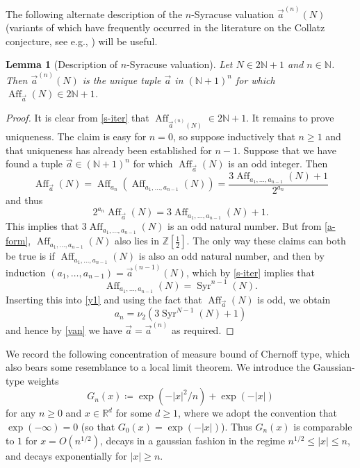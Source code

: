 \documentclass[12pt,a4paper,reqno]{amsart}
\numberwithin{equation}{section}
\theoremstyle{plain}
\newtheorem{lemma}[theorem]{Lemma}
\theoremstyle{definition}
\newcommand\R{\mathbb{R}}
\newcommand\Z{\mathbb{Z}}
\newcommand\N{\mathbb{N}}
\newcommand\Aff{{\operatorname{Aff}}}
\newcommand\Syr{{\operatorname{Syr}}}
\begin{document}
The following alternate description of the $n$-Syracuse valuation $\vec a^{(n)}(N)$ (variants of which have frequently occurred in the literature on the Collatz conjecture, see e.g., \cite{sinai}) will be useful.

\begin{lemma}[Description of $n$-Syracuse valuation]\label{iter-lem}  Let $N \in 2\N+1$ and $n \in \N$.  Then $\vec a^{(n)}(N)$ is the unique tuple $\vec a$ in $(\N+1)^n$ for which $\Aff_{\vec a}(N) \in 2\N+1$.
\end{lemma}

\begin{proof}  It is clear from \eqref{s-iter} that $\Aff_{\vec a^{(n)}(N)} \in 2\N+1$.  It remains to prove uniqueness.  The claim is easy for $n=0$, so suppose inductively that $n \geq 1$ and that uniqueness has already been established for $n-1$.  Suppose that we have found a tuple $\vec a \in (\N+1)^n$ for which $\Aff_{\vec a}(N)$ is an odd integer.  Then
$$ \Aff_{\vec a}(N) = \Aff_{a_n}( \Aff_{a_1,\dots,a_{n-1}}(N) ) = \frac{3\Aff_{a_1,\dots,a_{n-1}}(N)+1}{2^{a_n}}$$
and thus
\begin{equation}\label{y1}
 2^{a_n} \Aff_{\vec a}(N) =3\Aff_{a_1,\dots,a_{n-1}}(N)+1.
\end{equation}
This implies that $3\Aff_{a_1,\dots,a_{n-1}}(N)$ is an odd natural number.  But from \eqref{a-form}, $\Aff_{a_1,\dots,a_{n-1}}(N)$ also lies in $\Z[\frac{1}{2}]$.  The only way these claims can both be true is if $\Aff_{a_1,\dots,a_{n-1}}(N)$ is also an odd natural number, and then by induction $(a_1,\dots,a_{n-1}) = \vec a^{(n-1)}(N)$, which by \eqref{s-iter} implies that
$$ \Aff_{a_1,\dots,a_{n-1}}(N) = \Syr^{n-1}(N).$$
Inserting this into \eqref{y1} and using the fact that $\Aff_{\vec a}(N)$ is odd, we obtain
$$ a_n = \nu_2( 3\Syr^{N-1}(N) + 1 )$$
and hence by \eqref{van} we have $\vec a = \vec a^{(n)}$ as required.
\end{proof}

We record the following concentration of measure bound of Chernoff type, which also bears some resemblance to a local limit theorem.  We introduce the Gaussian-type weights
$$ G_n(x) \coloneqq \exp( - |x|^2/n ) + \exp( - |x| )$$
for any $n \geq 0$ and $x \in \R^d$ for some $d \geq 1$, where we adopt the convention that $\exp(-\infty)=0$ (so that $G_0(x) = \exp(-|x|)$).  Thus $G_n(x)$ is comparable to $1$ for $x = O(n^{1/2})$, decays in a gaussian fashion in the regime $n^{1/2} \leq |x| \leq n$, and decays exponentially for $|x| \geq n$.
\end{document}
